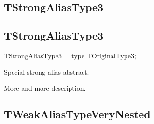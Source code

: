 \documentclass{report}
\newif\ifpdf
\begin{document}
\subsection*{\large{\textbf{TStrongAliasType3}}\normalsize\hspace{1ex}\hrulefill}
\else
\subsection*{TStrongAliasType3}
\fi
\label{ok_type_aliases-TStrongAliasType3}
\begin{list}{}{
\setlength{\itemindent}{0cm}
\setlength{\listparindent}{0cm}
\setlength{\leftmargin}{\evensidemargin}
\addtolength{\leftmargin}{\tmplength}
\settowidth{\labelsep}{X}
\addtolength{\leftmargin}{\labelsep}
\setlength{\labelwidth}{\tmplength}
}
\item[\textbf{Declaration}\hfill]
\ifpdf
\begin{flushleft}
\fi
\begin{ttfamily}
TStrongAliasType3 = type TOriginalType3;\end{ttfamily}

\ifpdf
\end{flushleft}
\fi

\par
\item[\textbf{Description}]
Special strong alias abstract.\hfill\vspace*{1ex}

 More and more description.

\end{list}
\ifpdf
\subsection*{\large{\textbf{TWeakAliasTypeVeryNested}}\normalsize\hspace{1ex}\hrulefill}
\else
\end{document}
